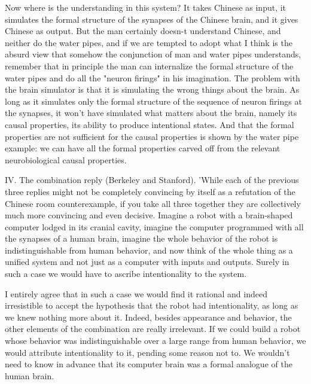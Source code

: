 Now where is the understanding in this system? It takes Chinese as input, it simulates the formal structure of
the synapses of the Chinese brain, and it gives Chinese as output. But the man certainly doesn-t understand
Chinese, and neither do the water pipes, and if we are tempted to adopt what I think is the absurd view that
somehow the conjunction of man and water pipes understands, remember that in principle the man can
internalize the formal structure of the water pipes and do all the "neuron firings" in his imagination. The problem
with the brain simulator is that it is simulating the wrong things about the brain. As long as it simulates only the
formal structure of the sequence of neuron firings at the synapses, it won't have simulated what matters about
the brain, namely its causal properties, its ability to produce intentional states. And that the formal properties are
not sufficient for the causal properties is shown by the water pipe example: we can have all the formal
properties carved off from the relevant neurobiological causal properties.

IV. The combination reply (Berkeley and Stanford). 'While each of the previous three replies might not be
completely convincing by itself as a refutation of the Chinese room counterexample, if you take all three together they are collectively much more convincing and even decisive. Imagine a robot with a brain-shaped computer lodged in its cranial cavity, imagine the computer programmed with all the synapses of a human brain, imagine
the whole behavior of the robot is indistinguishable from human behavior, and now think of the whole thing as a
unified system and not just as a computer with inputs and outputs. Surely in such a case we would have to
ascribe intentionality to the system.

I entirely agree that in such a case we would find it rational and indeed irresistible to accept the hypothesis that
the robot had intentionality, as long as we knew nothing more about it. Indeed, besides appearance and
behavior, the other elements of the combination are really irrelevant. If we could build a robot whose behavior
was indistinguishable over a large range from human behavior, we would attribute intentionality to it, pending
some reason not to. We wouldn't need to know in advance that its computer brain was a formal analogue of the
human brain.

